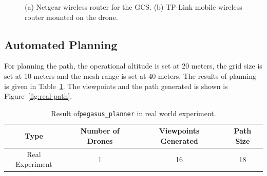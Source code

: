 \begin{figure}
	\centering
	\caption[Wireless routers used in experiment.]{\small 
		(a) Netgear wireless router for the GCS. (b) TP-Link mobile wireless router mounted on the drone. }
	
	\label{fig:real-routers}
\end{figure}

\subsection{Automated Planning}

For planning the path, the operational altitude is set at 20 meters, the grid size is set at 10 meters and the mesh range is set at 40 meters. The results of planning is given in Table~\ref{tab:real-world-planning}. The viewpoints and the path generated is shown is Figure~\ref{fig:real-path}.
\begin{table}[t]
	\caption[Result of \texttt{pegasus\_planner} in real world experiment.]{\small Result of\texttt{pegasus\_planner} in real world experiment.}
	\begin{center}
		\begin{tabular}{c|c|c|c}
			\hline Type & Number of Drones & Viewpoints Generated & Path Size \\ \hline \hline
			Real Experiment & 1 & 16 & 18 \\ \hline
		\end{tabular}
	\end{center}
	\label{tab:real-world-planning}
\end{table} 


